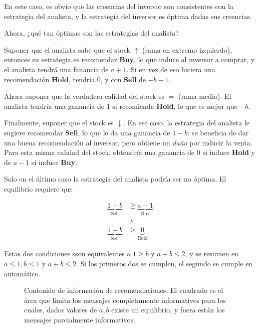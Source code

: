 \documentclass[12pt]{article}
\begin{document}
En este caso, es obvio que las creencias del inversor son consistentes con la estrategia del analista, y la estrategia del inversor es óptima dadas sus creencias.

Ahora, ¿qué tan óptimas son las estrategias del analista?

Suponer que el analista sabe que el stock $ \uparrow  $ (rama en extremo izquierdo), entonces su estrategia es recomendar \textbf{Buy}, lo que induce al inversor a comprar, y el analista tendrá una fanancia de $ a+1 $. Si en vez de eso hiciera una recomendación \textbf{Hold}, tendría 0, y con \textbf{Sell} de $ -b-1 $.

Ahora suponer que la verdadera calidad del stock es $ = $ (rama media). El analista tendría una ganancia de 1 si recomienda \textbf{Hold}, lo que es mejor que $ -b $.

Finalmente, suponer que el stock es $ \downarrow  $. En ese caso, la estrategia del analista le sugiere recomendar \textbf{Sell}, lo que le da una ganancia de $ 1-b $: se beneficia de dar una buena recomendación al inversor, pero obtiene un \textit{daño} por inducir la venta. Para esta misma calidad del stock, obtendría una ganancia de 0 si induce \textbf{Hold} y de $ a-1 $ si induce \textbf{Buy}.

Solo en el último caso la estrategia del analista podría ser no óptima. El equilibrio requiere que 

\begin{align*}
	\underbrace{1-b}_{\text{Sell}} &\geq \underbrace{a-1}_{\text{Buy}}\\ &\text{ y }\\
	\underbrace{1-b}_{\text{Sell}} &\geq\underbrace{0}_{\text{Hold}}
\end{align*}

Estas dos condiciones sson equivalentes a $ 1 \geq b $ y $ a+b \leq 2 $, y se resumen en $ a \leq 1, b \leq 1 $ y $a+b\leq 2 $. Si los primeros dos se cumplen, el segundo se cumple en automático.

\begin{figure}[H]
	\centering
	
	\caption{Contenido de información de recomendaciones. El cuadrado es el área que limita los mensajes completamente informativos para los cuales, dados valores de $ a,b$ existe un equilibrio, y fuera están los mensajes parcialmente informativos.}
\end{figure}
\end{document}
